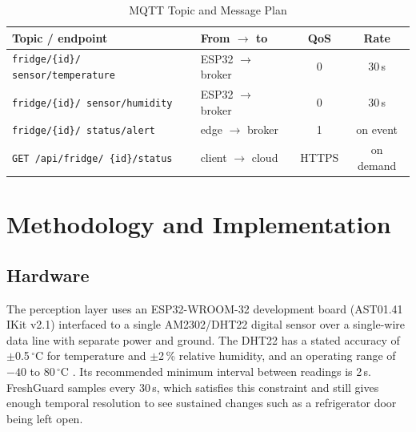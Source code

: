\documentclass[conference]{IEEEtran}
\newcommand{\degC}{\ensuremath{^{\circ}}C}
\begin{document}
\begin{table}[t]
\caption{MQTT Topic and Message Plan}
\label{tab:mqtt}
\centering
\footnotesize
\begin{tabular}{p{}p{}cc}
\toprule
Topic / endpoint & From $\rightarrow$ to & QoS & Rate \\
\midrule
\texttt{fridge/\{id\}/ sensor/temperature} & ESP32 $\rightarrow$ broker & 0 & 30\,s \\
\texttt{fridge/\{id\}/ sensor/humidity} & ESP32 $\rightarrow$ broker & 0 & 30\,s \\
\texttt{fridge/\{id\}/ status/alert} & edge $\rightarrow$ broker & 1 & on event \\
\texttt{GET /api/fridge/ \{id\}/status} & client $\rightarrow$ cloud & HTTPS & on demand \\
\bottomrule
\end{tabular}
\end{table}

\section{Methodology and Implementation}
\subsection{Hardware}
The perception layer uses an ESP32-WROOM-32 development board (AST01.41 IKit v2.1) interfaced to a single AM2302/DHT22 digital sensor over a single-wire data line with separate power and ground. The DHT22 has a stated accuracy of $\pm$0.5\,\degC{} for temperature and $\pm$2\,\% relative humidity, and an operating range of $-40$ to 80\,\degC{} \cite{dht22}. Its recommended minimum interval between readings is 2\,s. FreshGuard samples every 30\,s, which satisfies this constraint and still gives enough temporal resolution to see sustained changes such as a refrigerator door being left open.
\end{document}
